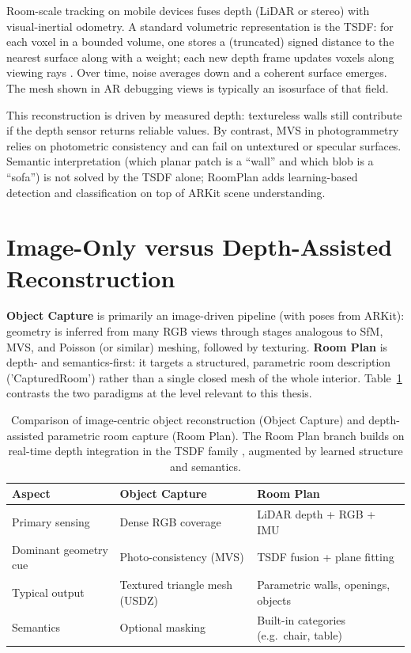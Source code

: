 Room-scale tracking on mobile devices fuses depth (LiDAR or stereo) with visual-inertial odometry. A standard volumetric representation is the TSDF: for each voxel in a bounded volume, one stores a (truncated) signed distance to the nearest surface along with a weight; each new depth frame updates voxels along viewing rays \cite{newcombe2011kinectfusion}. Over time, noise averages down and a coherent surface emerges. The mesh shown in AR debugging views is typically an isosurface of that field.

This reconstruction is driven by measured depth: textureless walls still contribute if the depth sensor returns reliable values. By contrast, MVS in photogrammetry relies on photometric consistency and can fail on untextured or specular surfaces. Semantic interpretation (which planar patch is a ``wall'' and which blob is a ``sofa'') is not solved by the TSDF alone; RoomPlan adds learning-based detection and classification on top of ARKit scene understanding.

\section{Image-Only versus Depth-Assisted Reconstruction}
\label{sec:depth_vs_photo}

\textbf{Object Capture} is primarily an image-driven pipeline (with poses from ARKit): geometry is inferred from many RGB views through stages analogous to SfM, MVS, and Poisson (or similar) meshing, followed by texturing. \textbf{Room Plan} is depth- and semantics-first: it targets a structured, parametric room description ('CapturedRoom') rather than a single closed mesh of the whole interior. Table~\ref{tab:depth_vs_photo} contrasts the two paradigms at the level relevant to this thesis.

\begin{table}[htbp]
\centering
\caption{Comparison of image-centric object reconstruction (Object Capture) and depth-assisted parametric room capture (Room Plan). The Room Plan branch builds on real-time depth integration in the TSDF family \cite{newcombe2011kinectfusion}, augmented by learned structure and semantics.}
\label{tab:depth_vs_photo}
\begin{tabular}{|p{}|p{}|p{}|}
\hline
\textbf{Aspect} & \textbf{Object Capture} & \textbf{Room Plan} \\
\hline
Primary sensing & Dense RGB coverage & LiDAR depth + RGB + IMU \\
\hline
Dominant geometry cue & Photo-consistency (MVS) & TSDF fusion + plane fitting \\
\hline
Typical output & Textured triangle mesh (USDZ) & Parametric walls, openings, objects \\
\hline
Semantics & Optional masking & Built-in categories (e.g.\ chair, table) \\
\hline
\end{tabular}
\end{table}

